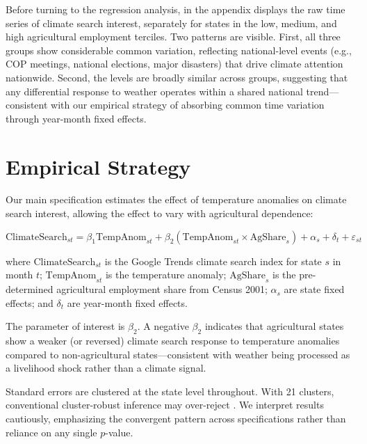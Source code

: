\documentclass[12pt]{article}
\begin{document}
Before turning to the regression analysis,  in the appendix displays the raw time series of climate search interest, separately for states in the low, medium, and high agricultural employment terciles. Two patterns are visible. First, all three groups show considerable common variation, reflecting national-level events (e.g., COP meetings, national elections, major disasters) that drive climate attention nationwide. Second, the levels are broadly similar across groups, suggesting that any differential response to weather operates within a shared national trend---consistent with our empirical strategy of absorbing common time variation through year-month fixed effects.

\section{Empirical Strategy}
\label{sec:strategy}

Our main specification estimates the effect of temperature anomalies on climate search interest, allowing the effect to vary with agricultural dependence:

\begin{equation}
\label{eq:main}
\text{ClimateSearch}_{st} = \beta_1 \text{TempAnom}_{st} + \beta_2 (\text{TempAnom}_{st} \times \text{AgShare}_s) + \alpha_s + \delta_t + \varepsilon_{st}
\end{equation}

where $\text{ClimateSearch}_{st}$ is the Google Trends climate search index for state $s$ in month $t$; $\text{TempAnom}_{st}$ is the temperature anomaly; $\text{AgShare}_s$ is the pre-determined agricultural employment share from Census 2001; $\alpha_s$ are state fixed effects; and $\delta_t$ are year-month fixed effects.

The parameter of interest is $\beta_2$. A negative $\beta_2$ indicates that agricultural states show a weaker (or reversed) climate search response to temperature anomalies compared to non-agricultural states---consistent with weather being processed as a livelihood shock rather than a climate signal.

Standard errors are clustered at the state level throughout. With 21 clusters, conventional cluster-robust inference may over-reject \citep{cameron2008bootstrap}. We interpret results cautiously, emphasizing the convergent pattern across specifications rather than reliance on any single $p$-value.
\end{document}
